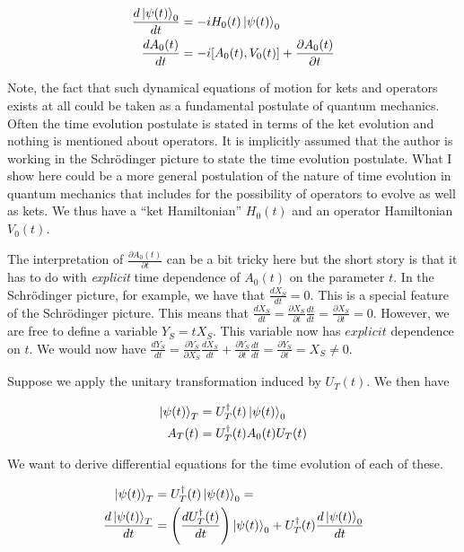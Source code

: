 \documentclass[12pt]{article}
\newcommand{\ddt}[1]{\frac{d #1}{dt}}
\begin{document}
\begin{align}
\ddt{\ket{\psi(t)}_0} &= -i H_0(t) \ket{\psi(t)}_0\\
\ddt{A_0(t)} &= -i[A_0(t),V_0(t)] + \frac{\partial A_0(t)}{\partial t}
\end{align}

Note, the fact that such dynamical equations of motion for kets and operators exists at all could be taken as a fundamental postulate of quantum mechanics. Often the time evolution postulate is stated in terms of the ket evolution and nothing is mentioned about operators. It is implicitly assumed that the author is working in the Schr{\"o}dinger picture to state the time evolution postulate. What I show here could be a more general postulation of the nature of time evolution in quantum mechanics that includes for the possibility of operators to evolve as well as kets. We thus have a ``ket Hamiltonian'' $H_0(t)$ and an operator Hamiltonian $V_0(t)$.

The interpretation of $\frac{\partial A_0(t)}{\partial t}$ can be a bit tricky here but the short story is that it has to do with \textit{explicit} time dependence of $A_0(t)$ on the parameter $t$. In the Schr{\"o}dinger picture, for example, we have that $\ddt{X_S} = 0$. This is a special feature of the Schr{\"o}dinger picture. This means that $\ddt{X_S} = \frac{\partial X_S}{\partial t} \ddt{t} = \frac{\partial X_S}{\partial t} =  0$. However, we are free to define a variable $Y_S = t X_S$. This variable now has $\textit{explicit}$ dependence on $t$. We would now have $\ddt{Y_S} = \frac{\partial{Y_S}}{\partial X_S} \ddt{X_S} + \frac{\partial{Y_S}}{\partial t} \ddt{t} = \frac{\partial Y_S}{\partial t} = X_S \neq 0$.

Suppose we apply the unitary transformation induced by $U_T(t)$. We then have

\begin{align}
\ket{\psi(t)}_T &= U_T^{\dag}(t) \ket{\psi(t)}_0\\
A_T(t) &= U_T^{\dag}(t) A_0(t) U_T(t)
\end{align}

We want to derive differential equations for the time evolution of each of these.

\begin{align}
\ket{\psi(t)}_T &= U_T^{\dag}(t)\ket{\psi(t)}_0 =\\
\ddt{\ket{\psi(t)}_T} &= \left(\ddt{U_T^{\dag}(t)} \right) \ket{\psi(t)}_0 + U_T^{\dag}(t) \ddt{\ket{\psi(t)}_0}
\end{align}
\end{document}
